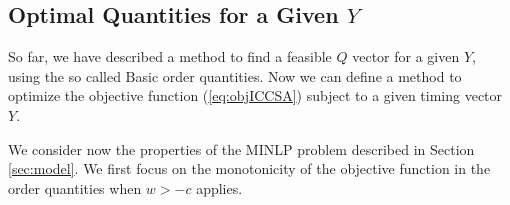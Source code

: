 \begin{table}[h]
	\caption{Basic order quantities}
	\label{tab:Ybasicorder}
	\centering
\end{table}

\subsection{Optimal Quantities for a Given $Y$}
\label{sec:nlp}
So far, we have described a method to find a feasible $Q$ vector for a given $Y$, using the so called Basic order quantities. Now we can define a method to optimize the objective function (\ref{eq:objICCSA}) subject to a given timing vector $Y$.

We consider now the properties of the MINLP problem described in Section \ref{sec:model}. We first focus on the monotonicity of the objective function in the order quantities when $w>-c$ applies.



